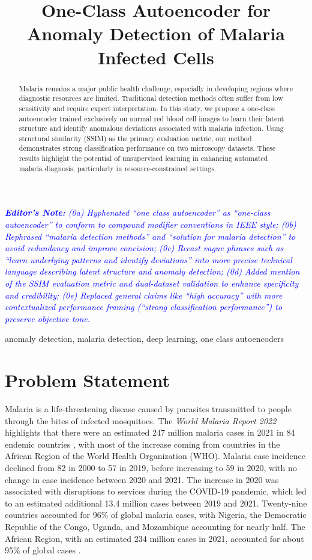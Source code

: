 \documentclass[journal,12pt,onecolumn,draftcls]{IEEEtran}
\newcommand{\editornote}[1]{\par\textit{\textcolor{blue}{\textbf{Editor's Note:} #1}}\par}
\begin{document}
\title{One-Class Autoencoder for Anomaly Detection of Malaria Infected Cells}
\author{}
\maketitle
\begin{abstract}
  Malaria remains a major public health challenge, especially in developing regions where diagnostic resources are limited. Traditional detection methods often suffer from low sensitivity and require expert interpretation. In this study, we propose a one-class autoencoder trained exclusively on normal red blood cell images to learn their latent structure and identify anomalous deviations associated with malaria infection. Using structural similarity (SSIM) as the primary evaluation metric, our method demonstrates strong classification performance on two microscopy datasets. These results highlight the potential of unsupervised learning in enhancing automated malaria diagnosis, particularly in resource-constrained settings.
\end{abstract}

\editornote{
(0a) Hyphenated “one class autoencoder” as “one-class autoencoder” to conform to compound modifier conventions in IEEE style;
(0b) Rephrased “malaria detection methods” and “solution for malaria detection” to avoid redundancy and improve concision;
(0c) Recast vague phrases such as “learn underlying patterns and identify deviations” into more precise technical language describing latent structure and anomaly detection;
(0d) Added mention of the SSIM evaluation metric and dual-dataset validation to enhance specificity and credibility;
(0e) Replaced general claims like “high accuracy” with more contextualized performance framing (“strong classification performance”) to preserve objective tone.
}

\begin{IEEEkeywords}
anomaly detection, malaria detection, deep learning, one class autoencoders
\end{IEEEkeywords}

\section{Problem Statement}
Malaria is a life-threatening disease caused by parasites transmitted to people through the bites of infected mosquitoes. The \textit{World Malaria Report 2022} highlights that there were an estimated 247 million malaria cases in 2021 in 84 endemic countries \cite{who2022}, with most of the increase coming from countries in the African Region of the World Health Organization (WHO). Malaria case incidence declined from 82 in 2000 to 57 in 2019, before increasing to 59 in 2020, with no change in case incidence between 2020 and 2021. The increase in 2020 was associated with disruptions to services during the COVID-19 pandemic, which led to an estimated additional 13.4 million cases between 2019 and 2021. Twenty-nine countries accounted for 96\% of global malaria cases, with Nigeria, the Democratic Republic of the Congo, Uganda, and Mozambique accounting for nearly half. The African Region, with an estimated 234 million cases in 2021, accounted for about 95\% of global cases \cite{who2022}.
\end{document}

